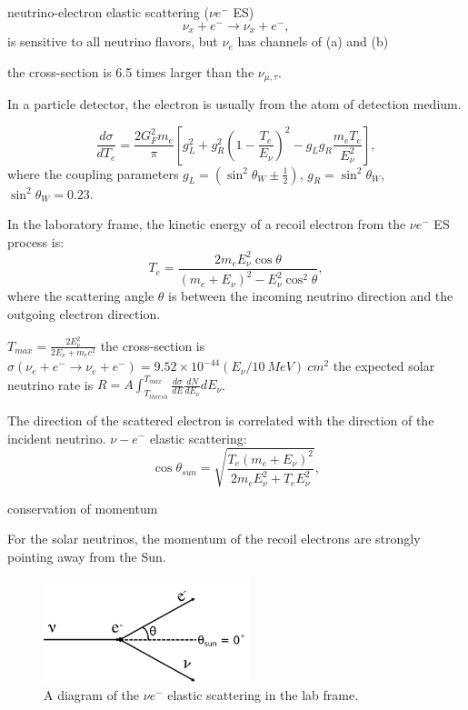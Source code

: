 neutrino-electron elastic scattering ($\nu e^-$ ES)
\begin{equation}
\nu_x + e^{-}\to\nu_x+e^-,
\end{equation}
is sensitive to all neutrino flavors, but $\nu_e$ has channels of (a) and (b)

the cross-section is 6.5 times larger than the $\nu_{\mu,\tau}$.


In a particle detector, the electron is usually from the atom of detection medium. 

\begin{equation}
\frac{d\sigma}{dT_e}=\frac{2G_F^2m_e}{\pi}[g_L^2+g_R^2\left(1-\frac{T_e}{E_\nu}\right)^2-g_Lg_R\frac{m_eT_e}{E_\nu^2}],
\end{equation}
where the coupling parameters $g_L=(\sin^2\theta_W\pm\frac{1}{2})$, $g_R=\sin^2\theta_W$, $\sin^2\theta_W=0.23$.

In the laboratory frame, the kinetic energy of a recoil electron from the $\nu e^-$ ES process is\cite{giunti2007fundamentals}:
\begin{equation}
T_e = \frac{2m_eE_\nu^2\cos\theta}{(m_e+E_\nu)^2-E_\nu^2\cos^2\theta},
\end{equation}
where the scattering angle $\theta$ is between the incoming neutrino direction and the outgoing electron direction.

$T_{max}=\frac{2E^2_\nu}{2E_\nu+m_e c^2}$
the cross-section is $\sigma(\nu_e+e^-\to \nu_e+e^-)=9.52\times 10^{-44}(E_\nu/10~MeV)~cm^2$
the expected solar neutrino rate is 
$R=A\int_{T_{thresh}}^{T_{max}}\frac{d\sigma}{dE}\frac{dN}{dE_\nu}dE_\nu$.

The direction of the scattered electron is correlated with the direction of the incident neutrino. 
$\nu-e^-$ elastic scattering: 
\begin{equation}\label{eq:costhetaSun}
\cos\theta_{sun}=\sqrt{\frac{T_e(m_e+E_\nu)^2}{2m_eE_\nu^2+T_eE_\nu^2}},
\end{equation}

conservation of momentum

For the solar neutrinos, the momentum of the recoil electrons are strongly pointing away from the Sun.
\begin{figure}[htbp]
	\centering	
	\includegraphics[width=6cm]{ElasticScatteringCartoon.png}
	\caption{A diagram of the $\nu e^-$ elastic scattering in the lab frame.}
	\label{fig:ESdiagram}
\end{figure}

